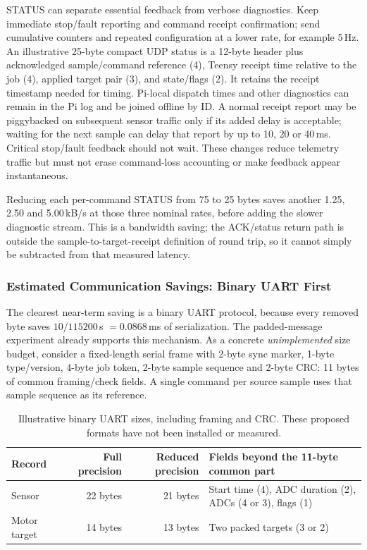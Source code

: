 STATUS can separate essential feedback from verbose diagnostics. Keep immediate stop/fault reporting and command receipt confirmation; send cumulative counters and repeated configuration at a lower rate, for example 5\,Hz. An illustrative 25-byte compact UDP status is a 12-byte header plus acknowledged sample/command reference (4), Teensy receipt time relative to the job (4), applied target pair (3), and state/flags (2). It retains the receipt timestamp needed for timing. Pi-local dispatch times and other diagnostics can remain in the Pi log and be joined offline by ID. A normal receipt report may be piggybacked on subsequent sensor traffic only if its added delay is acceptable; waiting for the next sample can delay that report by up to 10, 20 or 40\,ms. Critical stop/fault feedback should not wait. These changes reduce telemetry traffic but must not erase command-loss accounting or make feedback appear instantaneous.

Reducing each per-command STATUS from 75 to 25 bytes saves another 1.25, 2.50 and 5.00\,kB/s at those three nominal rates, before adding the slower diagnostic stream. This is a bandwidth saving; the ACK/status return path is outside the sample-to-target-receipt definition of round trip, so it cannot simply be subtracted from that measured latency.

\subsubsection{Estimated Communication Savings: Binary UART First}
The clearest near-term saving is a binary UART protocol, because every removed byte saves $10/115200$\,s $=0.0868$\,ms of serialization. The padded-message experiment already supports this mechanism. As a concrete \emph{unimplemented} size budget, consider a fixed-length serial frame with 2-byte sync marker, 1-byte type/version, 4-byte job token, 2-byte sample sequence and 2-byte CRC: 11 bytes of common framing/check fields. A single command per source sample uses that sample sequence as its reference.

\begin{table}[H]
\centering\small
\caption{Illustrative binary UART sizes, including framing and CRC. These proposed formats have not been installed or measured.}
\begin{tabular}{@{}lrrl@{}}
\toprule
Record & Full precision & Reduced precision & Fields beyond the 11-byte common part \\
\midrule
Sensor & 22 bytes & 21 bytes & Start time (4), ADC duration (2), ADCs (4 or 3), flags (1) \\
Motor target & 14 bytes & 13 bytes & Two packed targets (3 or 2) \\
\bottomrule
\end{tabular}
\end{table}

